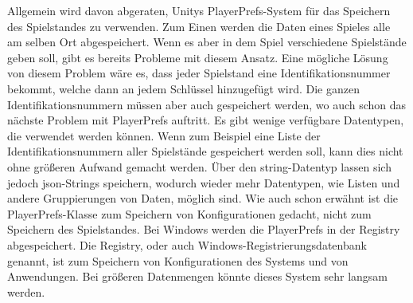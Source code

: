 Allgemein wird davon abgeraten, Unitys PlayerPrefs-System für das Speichern des Spielstandes zu verwenden.\cite{unityPersistentData}\cite{logrocketPlayerPrefs}\cite{gamedevbeginnerPlayerPrefs} Zum Einen werden die Daten eines Spieles alle am selben Ort abgespeichert. Wenn es aber in dem Spiel verschiedene Spielstände geben soll, gibt es bereits Probleme mit diesem Ansatz. Eine mögliche Lösung von diesem Problem wäre es, dass jeder Spielstand eine Identifikationsnummer bekommt, welche dann an jedem Schlüssel hinzugefügt wird.\cite{logrocketPlayerPrefs} Die ganzen Identifikationsnummern müssen aber auch gespeichert werden, wo auch schon das nächste Problem mit PlayerPrefs auftritt. Es gibt wenige verfügbare Datentypen, die verwendet werden können. Wenn zum Beispiel eine Liste der Identifikationsnummern aller Spielstände gespeichert werden soll, kann dies nicht ohne größeren Aufwand gemacht werden.\cite{logrocketPlayerPrefs} Über den string-Datentyp lassen sich jedoch \ac{json}-Strings speichern, wodurch wieder mehr Datentypen, wie Listen und andere Gruppierungen von Daten, möglich sind. Wie auch schon erwähnt ist die PlayerPrefs-Klasse zum Speichern von Konfigurationen gedacht, nicht zum Speichern des Spielstandes. Bei Windows werden die PlayerPrefs in der Registry abgespeichert. Die Registry, oder auch Windows-Registrierungsdatenbank genannt, ist zum Speichern von Konfigurationen des Systems und von Anwendungen.\cite{logrocketPlayerPrefs} Bei größeren Datenmengen könnte dieses System sehr langsam werden.\cite{gamedevbeginnerPlayerPrefs}


